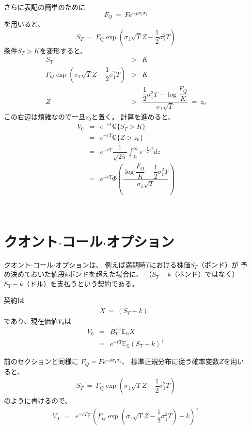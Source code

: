 \documentclass[uplatex,a4j,12pt,dvipdfmx]{jsarticle}
\begin{document}
さらに表記の簡単のために
$$
	F_{Q} \ = \ F e^{- \rho \sigma_{1} \sigma_{2} }
$$
を用いると、
$$
	S_{T}
	\ = \
	F_{Q}
	\exp \left( \sigma_{1} \sqrt{T} Z -
	\dfrac{1}{2} \sigma_{1}^{2} T
	\right)
$$
条件$S_{T}>K$を変形すると、
%
%
\begin{eqnarray}
	S_{T}
	&>&
	K
	\\
	F_{Q}
	\exp \left( \sigma_{1} \sqrt{T} Z -
	\dfrac{1}{2} \sigma_{1}^{2} T
	\right)
	&>&
	K
	\\
	Z
	&>&
	\dfrac{
		\dfrac{1}{2} \sigma_{1}^{2} T
		-
		\log
		\dfrac{F_{Q}}{K}
	}{\sigma_{1} \sqrt{T}}
	\ = \
	z_{0}
\end{eqnarray}
%
%
この右辺は煩雑なので一旦$z_{0}$と置く。
計算を進めると、
%
%
\begin{eqnarray}
	V_{0}
	&=&
	e^{-rT}
	\mathbb{Q}
	\{ S_{T} > K \}
	\\ &=&
	e^{-rT}
	\mathbb{Q}
	\{ Z > z_{0} \}
	\\ &=&
	e^{-rT}
	\dfrac{1}{ \sqrt{2 \pi} }
	\int^{\infty}_{z_{0}}
	e^{
			- \frac{1}{2} z^{2}
		} dz
	\\ &=&
	e^{-rT}
	\Phi
	\left(
	\dfrac{
		\log
		\dfrac{F_{Q}}{K}
		-
		\dfrac{1}{2} \sigma_{1}^{2} T
	}{\sigma_{1} \sqrt{T}}
	\right)
\end{eqnarray}
%
%


\ \\[-10mm]

\section{クオント$\cdot$コール$\cdot$オプション}
クオント$\cdot$コール$\cdot$オプションは、
例えば満期時$T$における株価$S_{T}$（ポンド）が
予め決めておいた値段$k$ポンドを超えた場合に、
（$S_{T} - k$（ポンド）ではなく）
$S_{T} - k$（ドル）を支払うという契約である。

契約は
%
%
\begin{eqnarray}
	X
	\ = \
	( S_{T} - k )^{+}
\end{eqnarray}
%
%
であり、現在価値$V_{0}$は
%
%
\begin{eqnarray}
	V_{0}
	& = &
	B^{-1}_{T}
	\mathbb{E}_{\mathbb{Q}}
	X
	\\ & = &
	e^{-rT}
	\mathbb{E}_{\mathbb{Q}}
	( S_{T} - k  )^{+}
\end{eqnarray}
%
%

前のセクションと同様に
$
	F_{Q} = F e^{- \rho \sigma_{1} \sigma_{2} }
$、
標準正規分布に従う確率変数$Z$を用いると、
%
%
\begin{eqnarray}
	S_{T}
	\ = \
	F_{Q}
	\exp \left( \sigma_{1} \sqrt{T} Z -
	\dfrac{1}{2} \sigma_{1}^{2} T
	\right)
\end{eqnarray}
%
%
のように書けるので、
%
%
\begin{eqnarray}
	V_{0}
	& = &
	e^{-rT}
	\mathbb{E}
	\left(
	F_{Q}
	\exp \left( \sigma_{1} \sqrt{T} Z -
	\dfrac{1}{2} \sigma_{1}^{2} T
	\right)
	- k
	\right)^{+}
\end{eqnarray}
%
%
\end{document}
